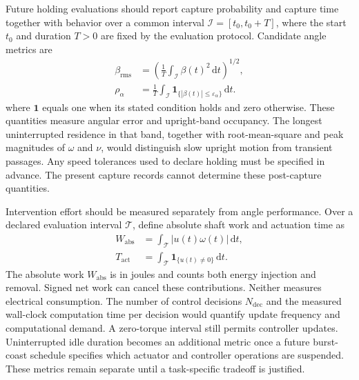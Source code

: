 \documentclass[letterpaper,10pt,conference]{ieeeconf}
\newcommand{\dd}{\mathrm{d}}
\newcommand{\ind}{\mathbf{1}}
\begin{document}
Future holding evaluations should report capture probability and capture time together with behavior over a common interval $\mathcal{I}=[t_0,t_0+T]$, where the start $t_0$ and duration $T>0$ are fixed by the evaluation protocol. Candidate angle metrics are
\begin{equation}
\begin{aligned}
 \beta_{\mathrm{rms}}&=\left(\frac{1}{T}\int_{\mathcal I}\beta(t)^2\,\dd t\right)^{1/2},\\
 \rho_\alpha&=\frac{1}{T}\int_{\mathcal I}\ind_{\{|\beta(t)|\leq\varepsilon_\alpha\}}\,\dd t.
\end{aligned}
\label{eq:holdingmetrics}
\end{equation}
where $\ind$ equals one when its stated condition holds and zero otherwise. These quantities measure angular error and upright-band occupancy. The longest uninterrupted residence in that band, together with root-mean-square and peak magnitudes of $\omega$ and $\nu$, would distinguish slow upright motion from transient passages. Any speed tolerances used to declare holding must be specified in advance. The present capture records cannot determine these post-capture quantities.

Intervention effort should be measured separately from angle performance. Over a declared evaluation interval $\mathcal T$, define absolute shaft work and actuation time as
\begin{equation}
\begin{aligned}
 W_{\mathrm{abs}}&=\int_{\mathcal T}|u(t)\omega(t)|\,\dd t,\\
 T_{\mathrm{act}}&=\int_{\mathcal T}\ind_{\{u(t)\neq0\}}\,\dd t.
\end{aligned}
\label{eq:resourcemetrics}
\end{equation}
The absolute work $W_{\mathrm{abs}}$ is in joules and counts both energy injection and removal. Signed net work can cancel these contributions. Neither measures electrical consumption. The number of control decisions $N_{\mathrm{dec}}$ and the measured wall-clock computation time per decision would quantify update frequency and computational demand. A zero-torque interval still permits controller updates. Uninterrupted idle duration becomes an additional metric once a future burst-coast schedule specifies which actuator and controller operations are suspended. These metrics remain separate until a task-specific tradeoff is justified.
\end{document}
